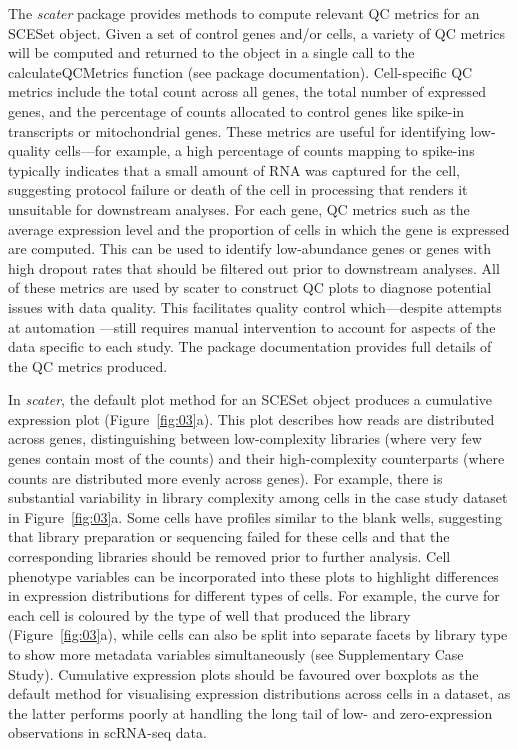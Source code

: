 \documentclass{bioinfo}
\begin{document}
The \emph{scater} package provides methods to compute relevant QC metrics for an SCESet object. Given a set of control genes and/or cells, a variety of QC metrics will be computed and returned to the object in a single call to the calculateQCMetrics function (see package documentation). Cell-specific QC metrics include the total count across all genes, the total number of expressed genes, and the percentage of counts allocated to control genes like spike-in transcripts or mitochondrial genes. These metrics are useful for identifying low-quality cells---for example, a high percentage of counts mapping to spike-ins typically indicates that a small amount of RNA was captured for the cell, suggesting protocol failure or death of the cell in processing that renders it unsuitable for downstream analyses. For each gene, QC metrics such as the average expression level and the proportion of cells in which the gene is expressed are computed. This can be used to identify low-abundance genes or genes with high dropout rates that should be filtered out prior to downstream analyses. All of these metrics are used by scater to construct QC plots to diagnose potential issues with data quality. This facilitates quality control which---despite attempts at automation \citep{Ilicic2016-dm}---still requires manual intervention to account for aspects of the data specific to each study. The package documentation provides full details of the QC metrics produced.

In \emph{scater}, the default plot method for an SCESet object produces
a cumulative expression plot (Figure~\ref{fig:03}a). This plot describes how reads are distributed across genes, distinguishing between low-complexity libraries (where very few genes contain most of the counts) and their high-complexity counterparts (where counts are distributed more evenly across genes).
For example, there is substantial variability in library complexity among cells in the case study dataset in Figure~\ref{fig:03}a. Some cells have profiles similar to the blank wells,
suggesting that library preparation or sequencing failed for these cells and
that the corresponding libraries should be removed prior to further analysis.
Cell phenotype variables can be incorporated into these plots to highlight
differences in expression distributions for different types of cells. For
example, the curve for each cell is coloured by the type of well that produced
the library (Figure~\ref{fig:03}a), while cells can also be split into separate
facets by library type to show more metadata variables simultaneously (see
Supplementary Case Study). Cumulative expression plots should be favoured over
boxplots as the default method for visualising expression distributions across
cells in a dataset, as the latter performs poorly at handling the long tail of
low- and zero-expression observations in scRNA-seq data.
\end{document}
